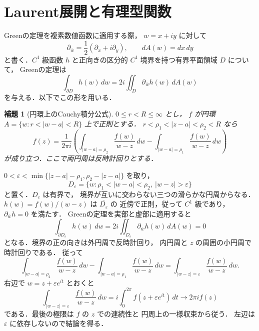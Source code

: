 \documentclass[a5paper,10pt,onecolumn]{jsarticle}
\makeatletter
\theoremstyle{mathnotetheorem}
\newtheorem{lemma}[theorem]{補題}
\renewcommand{\proofname}{証明}
\renewenvironment{proof}[1][\proofname]{%
  \par\pushQED{\qed}\normalfont\topsep4\p@\@plus2\p@\relax
  \trivlist\item[\hskip\labelsep\bfseries #1]\ignorespaces
}{\popQED\endtrivlist\@endpefalse}
\makeatother
\begin{document}
\section{Laurent展開と有理型関数}

Greenの定理を複素数値函数に適用する際，
$w=x+iy$ に対して
\[
 \partial_{\overline w}
 =\frac12(\partial_x+i\partial_y),\qquad
 dA(w)=dx\,dy
\]
と書く．$C^1$ 級函数 $h$ と正向きの区分的
$C^1$ 境界を持つ有界平面領域 $D$ について，
Greenの定理は
\[
 \int_{\partial D}h(w)\,dw
 =2i\iint_D\partial_{\overline w}h(w)\,dA(w)
\]
を与える．以下でこの形を用いる．

\begin{lemma}[円環上のCauchy積分公式]
\label{lem:annular-cauchy}
$0\le r<R\le\infty$ とし，
$f$ が円環 $A=\{w:r<|w-a|<R\}$ 上で正則とする．
$r<\rho_1<|z-a|<\rho_2<R$ なら
\[
 f(z)=\frac1{2\pi i}
 \left(
 \int_{|w-a|=\rho_2}\frac{f(w)}{w-z}\,dw
 -\int_{|w-a|=\rho_1}\frac{f(w)}{w-z}\,dw
 \right)
\]
が成り立つ．ここで両円周は反時計回りとする．
\end{lemma}
\begin{proof}
$0<\varepsilon<
 \min\{|z-a|-\rho_1,\rho_2-|z-a|\}$
を取り，
\[
 D_\varepsilon
 =\{w:\rho_1<|w-a|<\rho_2,\ |w-z|>\varepsilon\}
\]
と置く．$D_\varepsilon$ は有界で，
境界が互いに交わらない三つの滑らかな円周からなる．
$h(w)=f(w)/(w-z)$ は $\overline{D_\varepsilon}$ の
近傍で正則，従って $C^1$ 級であり，
$\partial_{\overline w}h=0$ を満たす．
Greenの定理を実部と虚部に適用すると
\[
 \int_{\partial D_\varepsilon}h(w)\,dw
 =2i\iint_{D_\varepsilon}
     \partial_{\overline w}h(w)\,dA(w)=0
\]
となる．境界の正の向きは外円周で反時計回り，
内円周と $z$ の周囲の小円周で時計回りである．
従って
\[
 \int_{|w-a|=\rho_2}\frac{f(w)}{w-z}\,dw
 -\int_{|w-a|=\rho_1}\frac{f(w)}{w-z}\,dw
 =\int_{|w-z|=\varepsilon}\frac{f(w)}{w-z}\,dw .
\]
右辺で $w=z+\varepsilon e^{it}$ とおくと
\[
 \int_{|w-z|=\varepsilon}\frac{f(w)}{w-z}\,dw
 =i\int_0^{2\pi}f(z+\varepsilon e^{it})\,dt
 \longrightarrow 2\pi i f(z)
\]
である．最後の極限は $f$ の $z$ での連続性と
円周上の一様収束から従う．
左辺は $\varepsilon$ に依存しないので結論を得る．
\end{proof}
\end{document}
